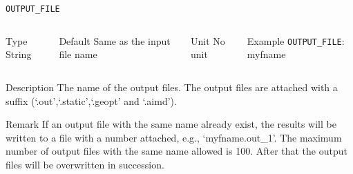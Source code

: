 \documentclass[xcolor=dvipsnames,t]{beamer}
\begin{document}
\begin{frame}[allowframebreaks]{\texttt{OUTPUT\_FILE}} \label{OUTPUT_FILE}
\vspace*{-12pt}
\begin{columns}
\begin{block}{Type}
String
\end{block}

\begin{block}{Default}
Same as the input file name
\end{block}

\begin{block}{Unit}
No unit
\end{block}

\begin{block}{Example}
\texttt{OUTPUT\_FILE}: myfname
\end{block}
\end{columns}

\begin{block}{Description}
The name of the output files. The output files are attached with a suffix (`.out',`.static',`.geopt' and `.aimd'). 
\end{block}

\begin{block}{Remark}
If an output file with the same name already exist, the results will be written to a file with a number attached, e.g., `myfname.out\_1'. The maximum number of output files with the same name allowed is 100. After that the output files will be overwritten in succession.
\end{block}

\end{frame}
\end{document}
